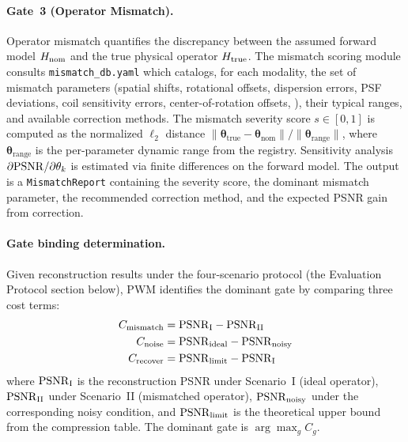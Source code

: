 \paragraph{Gate~3 (Operator Mismatch).}
Operator mismatch quantifies the discrepancy between the assumed forward
model $H_{\mathrm{nom}}$ and the true physical operator $H_{\mathrm{true}}$.  The
mismatch scoring module consults \texttt{mismatch\_db.yaml}
which catalogs, for each modality, the set of mismatch parameters
(spatial shifts, rotational offsets, dispersion errors, PSF deviations,
coil sensitivity errors, center-of-rotation offsets, \etc{}), their
typical ranges, and available correction methods.  The mismatch severity
score $s \in [0, 1]$ is computed as the normalized $\ell_2$ distance
$\| \boldsymbol{\theta}_{\text{true}} - \boldsymbol{\theta}_{\text{nom}} \|
/ \| \boldsymbol{\theta}_{\text{range}} \|$, where
$\boldsymbol{\theta}_{\text{range}}$ is the per-parameter dynamic range
from the registry.  Sensitivity analysis $\partial \mathrm{PSNR} / \partial
\theta_k$ is estimated via finite differences on the forward model.  The
output is a \texttt{MismatchReport} containing the severity score, the
dominant mismatch parameter, the recommended correction method, and the
expected PSNR gain from correction.

\paragraph{Gate binding determination.}
Given reconstruction results under the four-scenario protocol
(the Evaluation Protocol section below), PWM identifies the dominant gate by
comparing three cost terms:
\begin{align}
  C_{\text{mismatch}} &= \mathrm{PSNR}_{\text{I}} - \mathrm{PSNR}_{\text{II}} \label{eq:cost_mismatch} \\
  C_{\text{noise}}    &= \mathrm{PSNR}_{\text{ideal}} - \mathrm{PSNR}_{\text{noisy}} \label{eq:cost_noise} \\
  C_{\text{recover}}  &= \mathrm{PSNR}_{\text{limit}} - \mathrm{PSNR}_{\text{I}} \label{eq:cost_recover}
\end{align}
where $\mathrm{PSNR}_{\text{I}}$ is the reconstruction PSNR under Scenario~I
(ideal operator), $\mathrm{PSNR}_{\text{II}}$ under Scenario~II (mismatched
operator), $\mathrm{PSNR}_{\text{noisy}}$ under the corresponding noisy condition,
and $\mathrm{PSNR}_{\text{limit}}$ is the theoretical upper bound from the
compression table.  The dominant gate is $\arg\max_g C_g$.

